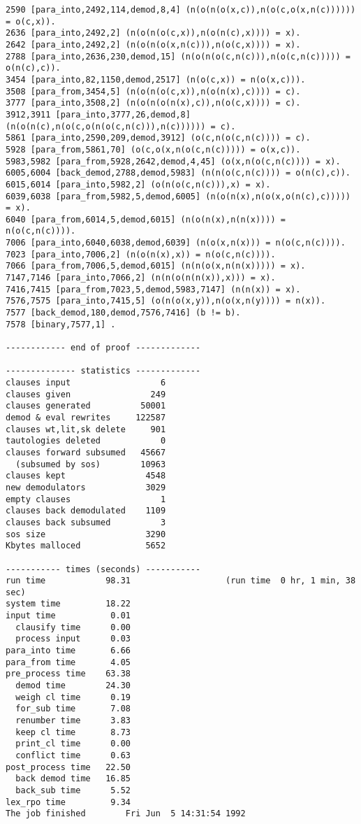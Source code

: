 {\begin{verbatim}
2590 [para_into,2492,114,demod,8,4] (n(o(n(o(x,c)),n(o(c,o(x,n(c)))))) = o(c,x)).
2636 [para_into,2492,2] (n(o(n(o(c,x)),n(o(n(c),x)))) = x).
2642 [para_into,2492,2] (n(o(n(o(x,n(c))),n(o(c,x)))) = x).
2788 [para_into,2636,230,demod,15] (n(o(n(o(c,n(c))),n(o(c,n(c))))) = o(n(c),c)).
3454 [para_into,82,1150,demod,2517] (n(o(c,x)) = n(o(x,c))).
3508 [para_from,3454,5] (n(o(n(o(c,x)),n(o(n(x),c)))) = c).
3777 [para_into,3508,2] (n(o(n(o(n(x),c)),n(o(c,x)))) = c).
3912,3911 [para_into,3777,26,demod,8] (n(o(n(c),n(o(c,o(n(o(c,n(c))),n(c)))))) = c).
5861 [para_into,2590,209,demod,3912] (o(c,n(o(c,n(c)))) = c).
5928 [para_from,5861,70] (o(c,o(x,n(o(c,n(c))))) = o(x,c)).
5983,5982 [para_from,5928,2642,demod,4,45] (o(x,n(o(c,n(c)))) = x).
6005,6004 [back_demod,2788,demod,5983] (n(n(o(c,n(c)))) = o(n(c),c)).
6015,6014 [para_into,5982,2] (o(n(o(c,n(c))),x) = x).
6039,6038 [para_from,5982,5,demod,6005] (n(o(n(x),n(o(x,o(n(c),c))))) = x).
6040 [para_from,6014,5,demod,6015] (n(o(n(x),n(n(x)))) = n(o(c,n(c)))).
7006 [para_into,6040,6038,demod,6039] (n(o(x,n(x))) = n(o(c,n(c)))).
7023 [para_into,7006,2] (n(o(n(x),x)) = n(o(c,n(c)))).
7066 [para_from,7006,5,demod,6015] (n(n(o(x,n(n(x))))) = x).
7147,7146 [para_into,7066,2] (n(n(o(n(n(x)),x))) = x).
7416,7415 [para_from,7023,5,demod,5983,7147] (n(n(x)) = x).
7576,7575 [para_into,7415,5] (o(n(o(x,y)),n(o(x,n(y)))) = n(x)).
7577 [back_demod,180,demod,7576,7416] (b != b).
7578 [binary,7577,1] .

------------ end of proof -------------

-------------- statistics -------------
clauses input                  6
clauses given                249
clauses generated          50001
demod & eval rewrites     122587
clauses wt,lit,sk delete     901
tautologies deleted            0
clauses forward subsumed   45667
  (subsumed by sos)        10963
clauses kept                4548
new demodulators            3029
empty clauses                  1
clauses back demodulated    1109
clauses back subsumed          3
sos size                    3290
Kbytes malloced             5652

----------- times (seconds) -----------
run time            98.31                   (run time  0 hr, 1 min, 38 sec)
system time         18.22
input time           0.01
  clausify time      0.00
  process input      0.03
para_into time       6.66
para_from time       4.05
pre_process time    63.38
  demod time        24.30
  weigh cl time      0.19
  for_sub time       7.08
  renumber time      3.83
  keep cl time       8.73
  print_cl time      0.00
  conflict time      0.63
post_process time   22.50
  back demod time   16.85
  back_sub time      5.52
lex_rpo time         9.34
The job finished        Fri Jun  5 14:31:54 1992
\end{verbatim} }
